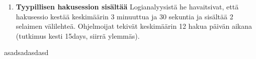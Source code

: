 \documentclass[finnish]{../tktltiki2}
\theoremstyle{definition}
\theoremstyle{remark}
\begin{document}
\begin{enumerate}
  \item {\bf Tyypillisen hakusession sisältää}
    Logianalyysistä he havaitsivat, että hakusessio kestää keskimäärin 3 minuuttua ja 30 sekuntia ja sisältää 2 selaimen välilehteä. Ohjelmoijat tekivät keskimäärin 12 hakua päivän aikana (tutkimus kesti 15days, siirrä ylemmäs).

\end{enumerate}
asadsadasdasd



%
%
% 
%







%
\end{document}
